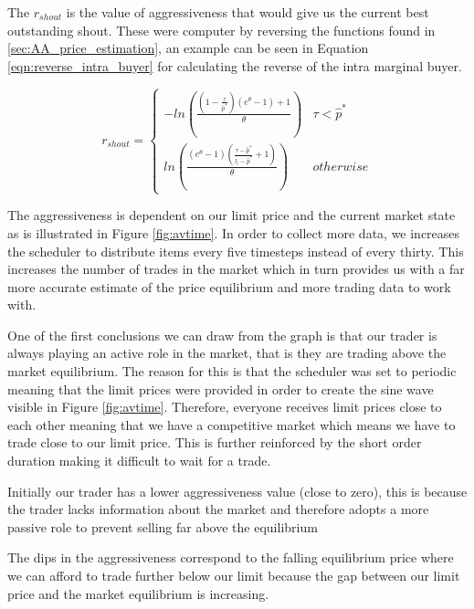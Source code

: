 \documentclass[preprint]{acm_proc_article-sp} %
\begin{document}
The $r_{shout}$ is the value of aggressiveness that would give us the current
best outstanding shout. These were computer by reversing the functions found in
\ref{sec:AA_price_estimation}, an example can be seen in Equation
\ref{eqn:reverse_intra_buyer} for calculating the reverse of the intra marginal
buyer.

\begin{equation}
r_{shout}=
\begin{cases}
 -ln\left(\frac{ (1-\frac{\tau}{\hat p^*}) (e^\theta-1) + 1}{\theta}\right) & \tau
< \hat p^*\\
ln\left( \frac{(e^\theta -1) (\frac{\tau - \hat p^*}{l_i - \hat p^*} + 1)
}{\theta} \right)&
\textstyle{otherwise}
\end{cases}
\label{eqn:reverse_intra_buyer}
\end{equation}

The aggressiveness is dependent on our limit price and the current market state as
is illustrated in Figure \ref{fig:avtime}. In order to collect more data, we
increases the scheduler to distribute items every five timesteps instead of
every thirty. This increases the number of trades in the market which in turn
provides us with a far more accurate estimate of the price equilibrium and more
trading data to work with.

One of the first conclusions we can draw from the graph is that our trader is
always playing an active role in the market, that is they are trading above the
market equilibrium. The reason for this is that the scheduler was set to
periodic meaning that the limit prices were provided in order to create the
sine wave visible in Figure \ref{fig:avtime}. Therefore, everyone receives limit
prices close to each other meaning that we have a competitive market which
means we have to trade close to our limit price. This is further reinforced by
the short order duration making it difficult to wait for a trade.

Initially our trader has a lower aggressiveness value (close to zero), this is
because the trader lacks information about the market and therefore adopts a
more passive role to prevent selling far above the equilibrium

The dips in the aggressiveness correspond to the falling equilibrium price
where we can afford to trade further below our limit because the gap between
our limit price and the market equilibrium is increasing.
\end{document}
